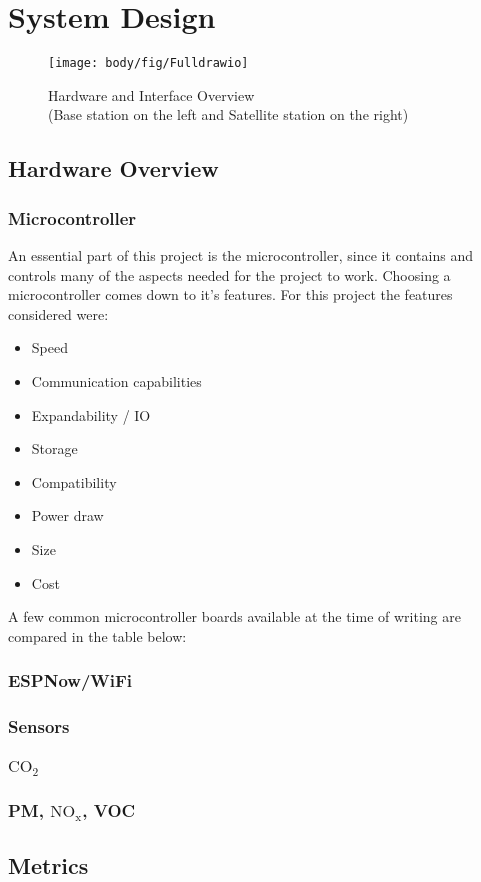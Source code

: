 \chapter{System Design}



\begin{figure}[!htb]
	\centering
	\texttt{[image: body/fig/Fulldrawio]}
	\caption{Hardware and Interface Overview \\(Base station on the left and Satellite station on the right) }
	\label{fig:fulldrawio}
\end{figure}

\section{Hardware Overview}
\subsection{Microcontroller}
An essential part of this project is the microcontroller, since it contains and controls many of the aspects needed for the project to work.
Choosing a microcontroller comes down to it's features. For this project the features considered were:
\begin{itemize}
	\item Speed
	\item Communication capabilities
	\item Expandability / IO
	\item Storage
	\item Compatibility
	\item Power draw
	\item Size
	\item Cost
\end{itemize}

A few common microcontroller boards available at the time of writing are compared in the table below:





\subsection{ESPNow/WiFi}

\subsection{Sensors}
\subsection{$\mathrm{CO_2}$}
\subsection{PM, $\mathrm{NO_x}$, VOC}

\section{Metrics}
